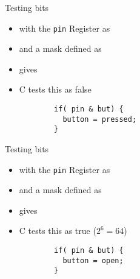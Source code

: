 \documentclass[svgnames,x11names]{beamer}
\begin{document}
\begin{frame}[fragile]{Testing bits}
\begin{example}
    \begin{itemize}
    \item with the \texttt{pin}  
    Register as
    \item and a mask defined as

    \item  {}  gives 
    \item C tests this as false
      \begin{verbatim}
        if( pin & but) {
          button = pressed;
        }
      \end{verbatim}
    \end{itemize}
  \end{example}
\end{frame}

\begin{frame}[fragile]{Testing bits}
\begin{example}
    \begin{itemize}
    \item with the \texttt{pin}  
    Register as
    \item and a mask defined as

    \item  {}  gives 
    \item C tests this as true ($2^6=64$)
      \begin{verbatim}
        if( pin & but) {
          button = open;
        }
      \end{verbatim}
    \end{itemize}
  \end{example}
\end{frame}



\end{document}
